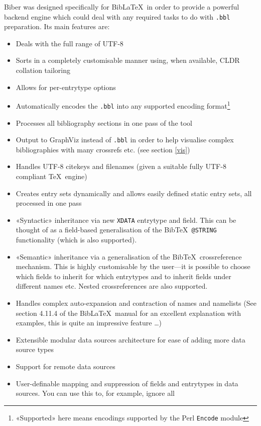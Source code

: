 \documentclass{ltxdockit}
\begin{document}
Biber was designed specifically for Bib\LaTeX\ in order to
provide a powerful backend engine which could deal with any required
tasks to do with \verb+.bbl+ preparation. Its main features are:

\begin{itemize}
\item Deals with the full range of UTF-8
\item Sorts in a completely customisable manner using, when available,
  CLDR collation tailoring
\item Allows for per-entrytype options
\item Automatically encodes the \verb+.bbl+ into any supported encoding
  format\footnote{«Supported» here means encodings supported by the
    Perl \texttt{Encode} module}
\item Processes all bibliography sections in one pass of the tool
\item Output to GraphViz instead of \verb+.bbl+ in order to help visualise
  complex bibliographies with many crossrefs etc. (see section \ref{vis})
\item Handles UTF-8 citekeys and filenames (given a suitable fully
  UTF-8 compliant \TeX\ engine)
\item Creates entry sets dynamically and allows easily defined static entry sets,
  all processed in one pass
\item «Syntactic» inheritance via new \verb+XDATA+ entrytype and
  field. This can be thought of as a field-based generalisation of the
  Bib\TeX\ \verb+@STRING+ functionality (which is also supported).
\item «Semantic» inheritance via a generalisation of the Bib\TeX\
  crossreference mechanism. This is highly customisable by the
  user---it is possible to choose which fields to inherit for which
  entrytypes and to inherit fields under different names etc. Nested
  crossreferences are also supported.
\item Handles complex auto-expansion and contraction of names and
  namelists (See section 4.11.4 of the Bib\LaTeX\ manual for an excellent
  explanation with examples, this is quite an impressive feature \ldots)
\item Extensible modular data sources architecture for ease of adding
  more data source types
\item Support for remote data sources
\item User-definable mapping and suppression of fields and entrytypes in
  data sources. You can use this to, for example, ignore all

\end{itemize}
\end{document}
